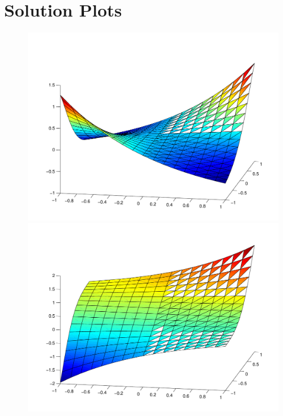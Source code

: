 \clearpage

\section{Solution Plots}

\begin{figure}[hbh]
\begin{center}
\includegraphics[height=0.27\textheight]{plots/poissonHybrid/phicubic16x16.pdf}\\
\includegraphics[height=0.27\textheight]{plots/poissonHybrid/psi1cubic16x16.pdf}\\

\end{center}
\end{figure}
